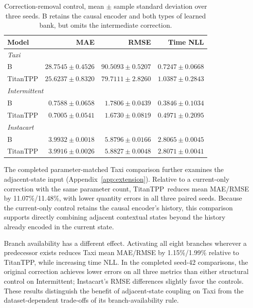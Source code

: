 \documentclass[runningheads]{llncs}
\newcommand{\method}{TitanTPP}
\begin{document}
\begin{table}[t]
\caption{Correction-removal control, mean $\pm$ sample standard deviation
over three seeds. B retains the causal encoder and both types of learned
bank, but omits the intermediate correction.}
\label{tab:ablation}\centering\small
\begin{tabular}{lrrr}
\toprule
Model & MAE & RMSE & Time NLL\\
\midrule
\multicolumn{4}{l}{\textit{Taxi}}\\
B & $28.7545\pm0.4526$ & $90.5093\pm0.5207$ & $0.7247\pm0.0668$\\
TitanTPP & $25.6237\pm0.8320$ & $79.7111\pm2.8260$ & $1.0387\pm0.2843$\\
\midrule
\multicolumn{4}{l}{\textit{Intermittent}}\\
B & $0.7588\pm0.0658$ & $1.7806\pm0.0439$ & $0.3846\pm0.1034$\\
TitanTPP & $0.7005\pm0.0541$ & $1.6730\pm0.0819$ & $0.4971\pm0.2095$\\
\midrule
\multicolumn{4}{l}{\textit{Instacart}}\\
B & $3.9932\pm0.0018$ & $5.8796\pm0.0166$ & $2.8065\pm0.0045$\\
TitanTPP & $3.9916\pm0.0026$ & $5.8827\pm0.0048$ & $2.8071\pm0.0041$\\
\bottomrule
\end{tabular}
\end{table}

The completed parameter-matched Taxi comparison further examines the
adjacent-state input (Appendix~\ref{app:extension}). Relative to a current-only
correction with the same parameter count, \method\ reduces mean MAE/RMSE
by 11.07\%/11.48\%, with lower quantity errors in all three paired seeds.
Because the current-only control retains the causal encoder's history,
this comparison supports directly combining adjacent contextual states
beyond the history already encoded in the current state.

Branch availability has a different effect. Activating all eight branches
wherever a predecessor exists reduces Taxi mean MAE/RMSE by 1.15\%/1.99\%
relative to \method, while increasing time NLL. In the completed seed-42
comparisons, the original correction achieves lower errors on all three
metrics than either structural control on Intermittent; Instacart's RMSE
differences slightly favor the controls. These results distinguish the
benefit of adjacent-state coupling on Taxi from the dataset-dependent
trade-offs of its branch-availability rule.
\end{document}
